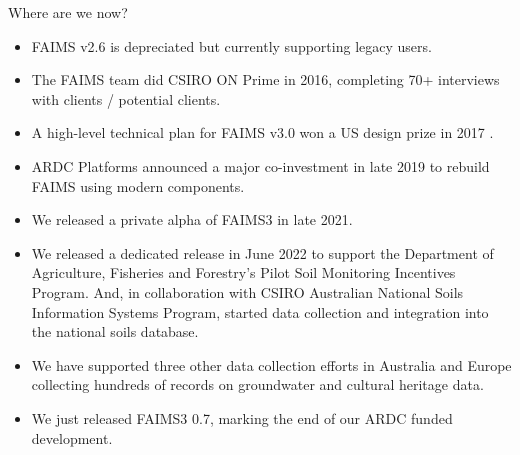 \begin{frame}{Where are we now?}
    \begin{itemize}
        \item FAIMS v2.6 is depreciated but currently supporting legacy users.
        \item The FAIMS team did CSIRO ON Prime in 2016, completing 70+ interviews with clients / potential clients.
        \item A high-level technical plan for FAIMS v3.0 won a US design prize in 2017 \parencite{Bureau_of_Reclamation2017-xl}.
        \item ARDC Platforms announced a major co-investment in late 2019 to rebuild FAIMS using modern components.
        \item We released a private alpha of FAIMS3 in late 2021.
        \item We released a dedicated release in June 2022 to support the Department of Agriculture, Fisheries and Forestry's Pilot Soil Monitoring Incentives Program. And, in collaboration with CSIRO Australian National Soils Information Systems Program, started data collection and integration into the national soils database.
        \item We have supported three other data collection efforts in Australia and Europe collecting hundreds of records on groundwater and cultural heritage data.
        \item We just released FAIMS3 0.7, marking the end of our ARDC funded development.
    \end{itemize}
\end{frame}


